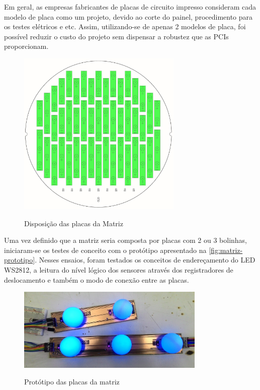 Em geral, as empresas fabricantes de placas de circuito impresso consideram cada modelo de placa como um projeto, devido ao corte do painel, procedimento para os testes elétricos e etc. Assim, utilizando-se de apenas 2 modelos de placa, foi possível reduzir o custo do projeto sem dispensar a robustez que as PCIs proporcionam.

\begin{figure}[H]
    \centering
    \caption{Disposição das placas da Matriz}
    \includegraphics[width=0.7\textwidth]{./dados/figuras/placas-matriz-colunas}
    \label{fig:placas-matriz-colunas}
\end{figure}

Uma vez definido que a matriz seria composta por placas com 2 ou 3 bolinhas, iniciaram-se os testes de conceito com o protótipo apresentado na \autoref{fig:matriz-prototipo}. Nesses ensaios, foram testados os conceitos de endereçamento do LED WS2812, a leitura do nível lógico dos sensores através dos registradores de deslocamento e também o modo de conexão entre as placas.

\begin{figure}[H]
    \centering
    \caption{Protótipo das placas da matriz}
    \includegraphics[width=0.8\textwidth]{./dados/figuras/mesa-protoboard}
    \label{fig:matriz-prototipo}
\end{figure}

